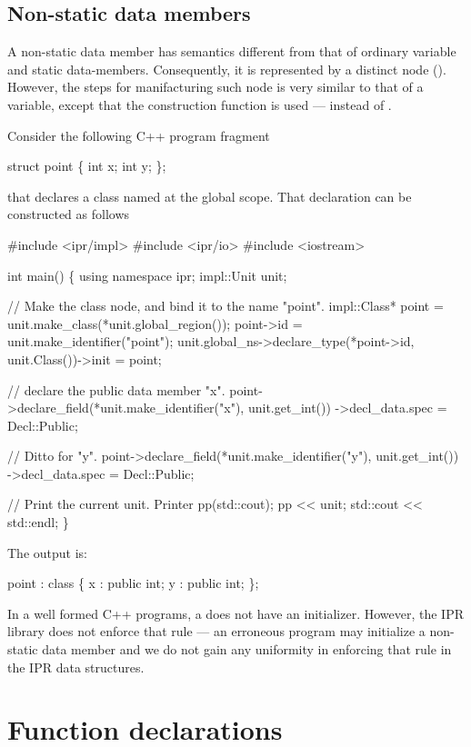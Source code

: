 \documentclass[11pt]{article}
\begin{document}
\subsection{Non-static data members}
\label{sec:named.data.nonstatic-member}

A non-static data member has semantics different from that of ordinary 
variable and static data-members.  Consequently, it is represented by a
distinct node ().  However, the steps for manifacturing such node
is very similar to that of a variable, except that the construction function 
 is used --- instead of .

Consider the following C++ program fragment
\begin{Program}
  struct point \{
    int x;
    int y;
  \};
\end{Program}
that declares a class named  at the global scope.  That
declaration can be constructed as follows
\begin{Program}
#include <ipr/impl>
#include <ipr/io>
#include <iostream>

int main()
\{
   using namespace ipr;
   impl::Unit unit;

   // Make the class node, and bind it to the name "point".
   impl::Class* point = unit.make_class(*unit.global_region());
   point->id = unit.make_identifier("point");
   unit.global_ns->declare_type(*point->id, unit.Class())->init = point;

   // declare the public data member "x".
   point->declare_field(*unit.make_identifier("x"), unit.get_int())
      ->decl_data.spec = Decl::Public;

   // Ditto for "y".
   point->declare_field(*unit.make_identifier("y"), unit.get_int())
      ->decl_data.spec = Decl::Public;

   // Print the current unit.
   Printer pp(std::cout);
   pp << unit;
   std::cout << std::endl;
\}
\end{Program}

The output is:
\begin{Program}
point : class \{
    x : public int;
    y : public int;
\};
\end{Program}
In a well formed C++ programs, a  does not have an initializer.
However, the IPR library does not enforce that rule --- an erroneous program
may initialize a non-static data member and we do not gain any uniformity in
enforcing that rule in the IPR data structures. 

\section{Function declarations}
\label{sec:fun-decl}
\end{document}
